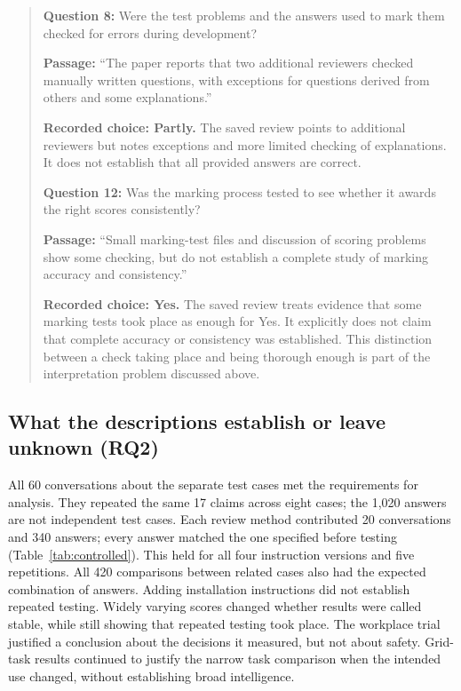 \documentclass[10pt,conference]{IEEEtran}
\begin{document}
\begin{quote}
\textbf{Question 8:} Were the test problems and the answers used to mark them checked for errors during development?

\textbf{Passage:} ``The paper reports that two additional reviewers checked manually written questions, with exceptions for questions derived from others and some explanations.''

\textbf{Recorded choice: Partly.} The saved review points to additional reviewers but notes exceptions and more limited checking of explanations. It does not establish that all provided answers are correct.

\textbf{Question 12:} Was the marking process tested to see whether it awards the right scores consistently?

\textbf{Passage:} ``Small marking-test files and discussion of scoring problems show some checking, but do not establish a complete study of marking accuracy and consistency.''

\textbf{Recorded choice: Yes.} The saved review treats evidence that some marking tests took place as enough for Yes. It explicitly does not claim that complete accuracy or consistency was established. This distinction between a check taking place and being thorough enough is part of the interpretation problem discussed above.
\end{quote}

\subsection{What the descriptions establish or leave unknown (RQ2)}
All 60 conversations about the separate test cases met the requirements for analysis. They repeated the same 17 claims across eight cases; the 1,020 answers are not independent test cases. Each review method contributed 20 conversations and 340 answers; every answer matched the one specified before testing (Table~\ref{tab:controlled}). This held for all four instruction versions and five repetitions. All 420 comparisons between related cases also had the expected combination of answers. Adding installation instructions did not establish repeated testing. Widely varying scores changed whether results were called stable, while still showing that repeated testing took place. The workplace trial justified a conclusion about the decisions it measured, but not about safety. Grid-task results continued to justify the narrow task comparison when the intended use changed, without establishing broad intelligence.
\end{document}
